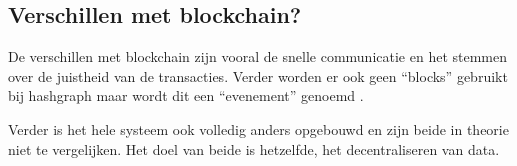 \subsection{Verschillen met blockchain?}
De verschillen met blockchain zijn vooral de snelle communicatie en het stemmen over de juistheid van de transacties. Verder worden er ook geen ``blocks'' gebruikt bij hashgraph maar wordt dit een ``evenement'' genoemd \textcite{Baird2016a}.

Verder is het hele systeem ook volledig anders opgebouwd en zijn beide in theorie niet te vergelijken. Het doel van beide is hetzelfde, het decentraliseren van data. 